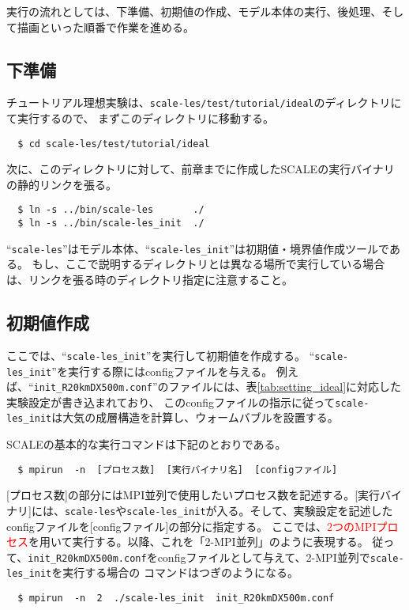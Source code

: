 実行の流れとしては、下準備、初期値の作成、モデル本体の実行、後処理、そして描画といった順番で作業を進める。

\subsection{下準備}
チュートリアル理想実験は、\verb|scale-les/test/tutorial/ideal|のディレクトリにて実行するので、
まずこのディレクトリに移動する。
\begin{verbatim}
  $ cd scale-les/test/tutorial/ideal
\end{verbatim}
次に、このディレクトリに対して、前章までに作成したSCALEの実行バイナリの静的リンクを張る。
\begin{verbatim}
  $ ln -s ../bin/scale-les       ./
  $ ln -s ../bin/scale-les_init  ./
\end{verbatim}
``\verb|scale-les|''はモデル本体、``\verb|scale-les_init|''は初期値・境界値作成ツールである。
もし、ここで説明するディレクトリとは異なる場所で実行している場合は、リンクを張る時のディレクトリ指定に注意すること。

\subsection{初期値作成}
ここでは、``\verb|scale-les_init|''を実行して初期値を作成する。
``\verb|scale-les_init|''を実行する際にはconfigファイルを与える。
例えば、``\verb|init_R20kmDX500m.conf|''のファイルには、表\ref{tab:setting_ideal}に対応した実験設定が書き込まれており、
このconfigファイルの指示に従って\verb|scale-les_init|は大気の成層構造を計算し、ウォームバブルを設置する。


SCALEの基本的な実行コマンドは下記のとおりである。
\begin{verbatim}
  $ mpirun  -n  [プロセス数]  [実行バイナリ名]  [configファイル]
\end{verbatim}
[プロセス数]の部分にはMPI並列で使用したいプロセス数を記述する。[実行バイナリ]には、\verb|scale-les|や\verb|scale-les_init|が入る。そして、実験設定を記述したconfigファイルを[configファイル]の部分に指定する。
ここでは、\textcolor{red}{2つのMPIプロセス}を用いて実行する。以降、これを「2-MPI並列」のように表現する。
従って、\verb|init_R20kmDX500m.conf|をconfigファイルとして与えて、2-MPI並列で\verb|scale-les_init|を実行する場合の
コマンドはつぎのようになる。
\begin{verbatim}
  $ mpirun  -n  2  ./scale-les_init  init_R20kmDX500m.conf
\end{verbatim}

